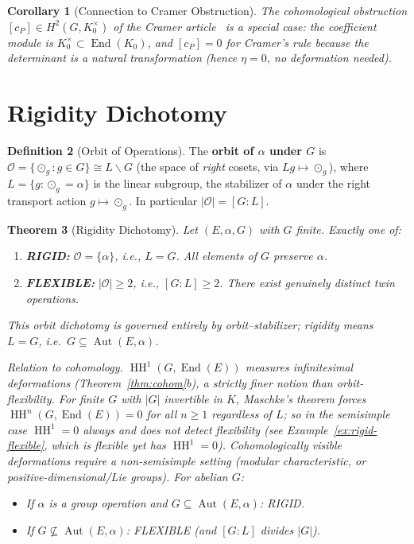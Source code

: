 \documentclass[11pt,twocolumn]{article}
\theoremstyle{plain}\newtheorem{theorem}{Theorem}\newtheorem{proposition}[theorem]{Proposition}\newtheorem{corollary}[theorem]{Corollary}\newtheorem{lemma}[theorem]{Lemma}
\theoremstyle{definition}\newtheorem{definition}[theorem]{Definition}\newtheorem{example}[theorem]{Example}
\theoremstyle{remark}\newtheorem{remark}[theorem]{Remark}
\newcommand{\HH}{\operatorname{HH}}
\newcommand{\Aut}{\operatorname{Aut}}
\newcommand{\End}{\operatorname{End}}
\begin{document}
\begin{corollary}[Connection to Cramer Obstruction]
The cohomological obstruction $[c_P] \in H^2(G, K_0^\times)$ of the Cramer article~\cite{nembe2026cramer} is a special case: the coefficient module is $K_0^\times \subset \End(K_0)$, and $[c_P] = 0$ for Cramer's rule because the determinant is a natural transformation (hence $\eta = 0$, no deformation needed).
\end{corollary}


\section{Rigidity Dichotomy}
\label{sec:rigidity}

\begin{definition}[Orbit of Operations]\label{def:orbit-ops}
The \textbf{orbit of $\alpha$ under $G$} is $\mathcal{O} = \{\odot_g : g \in G\} \cong L\backslash G$ (the space of \emph{right} cosets, via $Lg \mapsto \odot_g$), where $L = \{g : \odot_g = \alpha\}$ is the linear subgroup, the stabilizer of $\alpha$ under the right transport action $g \mapsto \odot_g$. In particular $|\mathcal{O}| = [G:L]$.
\end{definition}

\begin{theorem}[Rigidity Dichotomy]\label{thm:rigidity}
Let $(E, \alpha, G)$ with $G$ finite. Exactly one of:
\begin{enumerate}[label=(\alph*)]
    \item \textbf{RIGID:} $\mathcal{O} = \{\alpha\}$, i.e., $L = G$. All elements of $G$ preserve $\alpha$.
    \item \textbf{FLEXIBLE:} $|\mathcal{O}| \geq 2$, i.e., $[G:L] \geq 2$. There exist genuinely distinct twin operations.
\end{enumerate}

This orbit dichotomy is governed entirely by orbit--stabilizer; rigidity means $L = G$, i.e.\ $G \subseteq \Aut(E, \alpha)$.

\emph{Relation to cohomology.} $\HH^1(G, \End(E))$ measures \emph{infinitesimal} deformations (Theorem~\ref{thm:cohom}b), a strictly finer notion than orbit-flexibility. For finite $G$ with $|G|$ invertible in $K$, Maschke's theorem forces $\HH^n(G, \End(E)) = 0$ for all $n \geq 1$ \emph{regardless of $L$}; so in the semisimple case $\HH^1 = 0$ always and does \emph{not} detect flexibility (see Example~\ref{ex:rigid-flexible}, which is flexible yet has $\HH^1 = 0$). Cohomologically visible deformations require a non-semisimple setting (modular characteristic, or positive-dimensional/Lie groups). For abelian $G$:
\begin{itemize}
    \item If $\alpha$ is a group operation and $G \subseteq \Aut(E, \alpha)$: RIGID.
    \item If $G \not\subseteq \Aut(E, \alpha)$: FLEXIBLE (and $[G:L]$ divides $|G|$).
\end{itemize}
\end{theorem}
\end{document}
